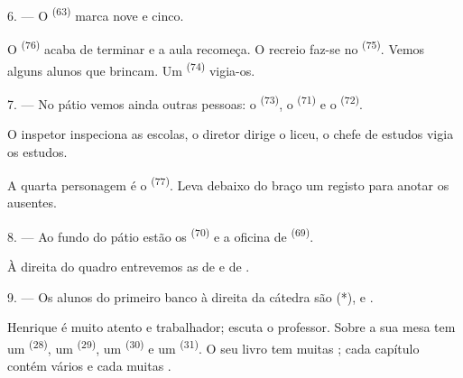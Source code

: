 6. --- O  \textsuperscript{(63)} marca nove e cinco.

O  \textsuperscript{(76)} acaba de terminar e a aula recomeça. O
recreio faz-se no  \textsuperscript{(75)}. Vemos alguns alunos que
brincam. Um  \textsuperscript{(74)} vigia-os.

7. --- No pátio vemos ainda outras pessoas: o 
\textsuperscript{(73)}, o  \textsuperscript{(71)} e o
 \textsuperscript{(72)}.

O inspetor inspeciona as escolas, o diretor dirige o liceu, o chefe de
estudos vigia os estudos.

A quarta personagem é o  \textsuperscript{(77)}. Leva debaixo do
braço um registo para anotar os ausentes.

8. --- Ao fundo do pátio estão os 
\textsuperscript{(70)} e a oficina de 
\textsuperscript{(69)}.

À direita do quadro entrevemos as  de  e de
.


\VUsaut{2.4mm}

\VUsaut{3.0mm}

9. --- Os alunos do primeiro banco à direita da cátedra são
 (*),  e .

Henrique é muito atento e trabalhador; escuta o professor. Sobre a sua
mesa tem um  \textsuperscript{(28)}, um 
\textsuperscript{(29)}, um  \textsuperscript{(30)} e um
 \textsuperscript{(31)}. O seu livro tem muitas ;
cada capítulo contém vários  e cada 
muitas .

